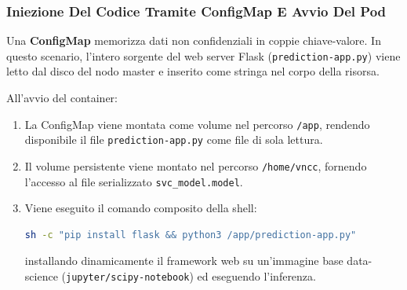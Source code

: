 \documentclass[11pt, a4paper]{article}
\begin{document}
\subsubsection{Iniezione Del Codice Tramite ConfigMap E Avvio Del Pod}

Una \textbf{ConfigMap} memorizza dati non confidenziali in coppie chiave-valore. In questo scenario, l'intero sorgente del web server Flask (\texttt{prediction-app.py}) viene letto dal disco del nodo master e inserito come stringa nel corpo della risorsa.

All'avvio del container:
\begin{enumerate}[noitemsep]
    \item La ConfigMap viene montata come volume nel percorso \texttt{/app}, rendendo disponibile il file \texttt{prediction-app.py} come file di sola lettura.
    \item Il volume persistente viene montato nel percorso \texttt{/home/vncc}, fornendo l'accesso al file serializzato \texttt{svc\_model.model}.
    \item Viene eseguito il comando composito della shell:
    \begin{lstlisting}[language=bash]
    sh -c "pip install flask && python3 /app/prediction-app.py"
    \end{lstlisting}
    installando dinamicamente il framework web su un'immagine base data-science (\texttt{jupyter/scipy-notebook}) ed eseguendo l'inferenza.
\end{enumerate}
\end{document}
